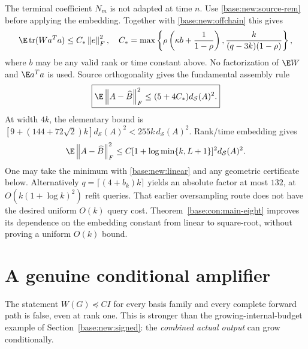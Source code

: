 \documentclass[11pt,oneside,openany,a4paper]{book}
\numberwithin{equation}{chapter}
\theoremstyle{definition}
\theoremstyle{remark}
\newcommand{\F}[1]{\left\lVert#1\right\rVert_F}
\DeclareMathOperator{\tr}{tr}\DeclareMathOperator{\rank}{rank}
\begin{document}
The terminal coefficient $N_m$ is not adapted at time $n$. Use \eqref{base:new:source-rem} before applying the embedding. Together with \eqref{base:new:offchain} this gives
\begin{equation}\label{base:new:Cstar}
 \E\tr(Wa^Ta)\le C_*\F e^2,\quad
 C_*=
 \max\left\{\rho\left(\kappa b+\frac1{1-\rho}\right),
 \frac{k}{(q-3k)(1-\rho)}\right\},
\end{equation}
where $b$ may be any valid rank or time constant above. No factorization of $\E W$ and $\E a^Ta$ is used. Source orthogonality gives the fundamental assembly rule
\begin{equation}\label{base:new:assembly}
 \boxed{\E\F{A-\widehat B}^2\le(5+4C_*)d_{\mathcal S}(A)^2.}
\end{equation}
At width $4k$, the elementary bound is
$[9+(144+72\sqrt2)k]d_{\mathcal S}(A)^2<255k\,d_{\mathcal S}(A)^2$.
Rank/time embedding gives
\begin{equation}\label{base:new:general-log}
 \E\F{A-\widehat B}^2\le C[1+\log\min\{k,L+1\}]^2d_{\mathcal S}(A)^2.
\end{equation}
One may take the minimum with \eqref{base:new:linear} and any geometric certificate below. Alternatively $q=\lceil(4+b_k)k\rceil$ yields an absolute factor at most $132$, at $O(k(1+\log k)^2)$ refit queries. That earlier oversampling route does not have the desired uniform $O(k)$ query cost. Theorem~\ref{base:con:main-eight} improves its dependence on the embedding constant from linear to square-root, without proving a uniform $O(k)$ bound.


\section{A genuine conditional amplifier}\label{base:new:amplifier}
The statement $W(G)\preceq CI$ for every basis family and every complete forward path is false, even at rank one. This is stronger than the growing-internal-budget example of Section~\ref{base:new:signed}: the \emph{combined actual output} can grow conditionally.
\end{document}

